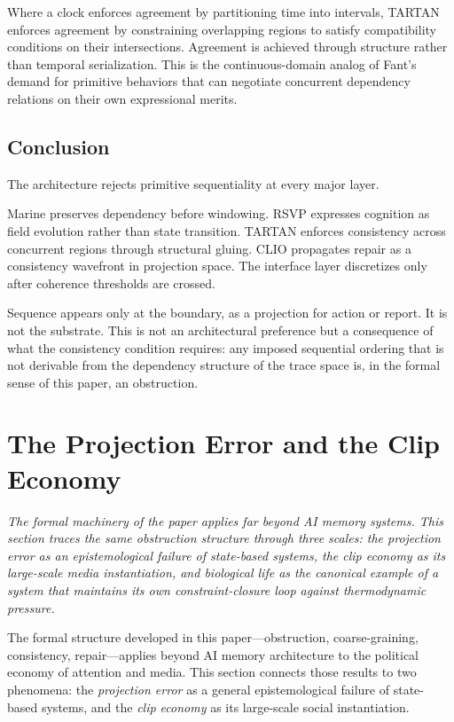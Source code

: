 \documentclass[12pt,a4paper]{article}
\begin{document}
Where a clock enforces agreement by partitioning time into intervals, TARTAN enforces agreement by constraining overlapping regions to satisfy compatibility conditions on their intersections. Agreement is achieved through structure rather than temporal serialization. This is the continuous-domain analog of Fant's demand for primitive behaviors that can negotiate concurrent dependency relations on their own expressional merits.

\subsection{Conclusion}

The architecture rejects primitive sequentiality at every major layer.

Marine preserves dependency before windowing. RSVP expresses cognition as field evolution rather than state transition. TARTAN enforces consistency across concurrent regions through structural gluing. CLIO propagates repair as a consistency wavefront in projection space. The interface layer discretizes only after coherence thresholds are crossed.

Sequence appears only at the boundary, as a projection for action or report. It is not the substrate. This is not an architectural preference but a consequence of what the consistency condition requires: any imposed sequential ordering that is not derivable from the dependency structure of the trace space is, in the formal sense of this paper, an obstruction.

\section{The Projection Error and the Clip Economy}
\label{sec:projection_error}

\textit{The formal machinery of the paper applies far beyond AI memory systems. This section traces the same obstruction structure through three scales: the projection error as an epistemological failure of state-based systems, the clip economy as its large-scale media instantiation, and biological life as the canonical example of a system that maintains its own constraint-closure loop against thermodynamic pressure.}

The formal structure developed in this paper---obstruction, coarse-graining, consistency, repair---applies beyond AI memory architecture to the political economy of attention and media. This section connects those results to two phenomena: the \emph{projection error} as a general epistemological failure of state-based systems, and the \emph{clip economy} as its large-scale social instantiation.
\end{document}
